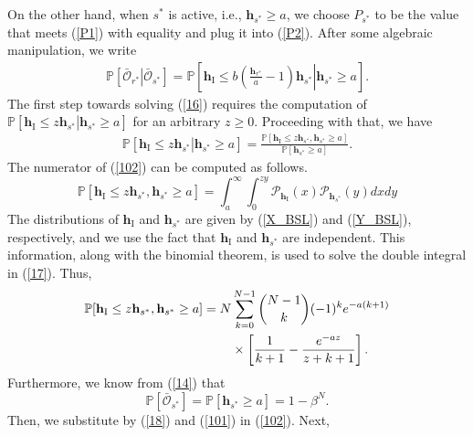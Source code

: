 \documentclass[journal,twocolumn]{IEEEtran}
\begin{document}
On the other hand, when $s^*$ is active, i.e., $\mathbf{h}_{s^*} \geq a$, we choose $P_{s^*}$ to be the value that meets (\ref{P1}) with equality and plug it into (\ref{P2}). After some algebraic manipulation, we write
\begin{align}\label{16}
\mathbb{P}\left[ \left. \bar{\mathcal{O}}_{r^*} \right| \bar{\mathcal{O}}_{s^*}\right] \!=\!
\mathbb{P}\left[ \mathbf{h}_{\mathrm{I}} \leq \left. b\left( \frac{\mathbf{h}_{r^*}}{a}-1 \right)\mathbf{h}_{s^*} \right| \mathbf{h}_{s^*} \geq a \right]\!.
\end{align}
The first step towards solving (\ref{16}) requires the computation of $\mathbb{P}[\left. \mathbf{h}_{\mathrm{I}} \leq z\mathbf{h}_{s^*} \right| \mathbf{h}_{s^*} \geq a]$ for an arbitrary $z \geq 0$. Proceeding with that, we have
\begin{align}\label{102}
\mathbb{P}[\left. \mathbf{h}_{\mathrm{I}} \leq z\mathbf{h}_{s^*} \right| \mathbf{h}_{s^*} \geq a]=
\frac{\mathbb{P}[\mathbf{h}_{\mathrm{I}} \leq z \mathbf{h}_{s^*},\mathbf{h}_{s^*} \geq a]}
{\mathbb{P}[\mathbf{h}_{s^*} \geq a]}.
\end{align}
The numerator of (\ref{102}) can be computed as follows.
\begin{equation}\label{17}
\mathbb{P}[\mathbf{h}_{\mathrm{I}} \leq z \mathbf{h}_{s^*},\mathbf{h}_{s^*} \geq a]\!=\!\!
\int_{a}^{\infty} \!\!\!\! \int_{0}^{zy} \mathcal{P}_{\mathbf{h}_{\mathrm{I}}} (x)
\mathcal{P}_{\mathbf{h}_{s^*}} (y) dx dy
\end{equation}
The distributions of $\mathbf{h}_{\mathrm{I}}$ and $\mathbf{h}_{s^*}$ are given by (\ref{X_BSL}) and (\ref{Y_BSL}), respectively, and we use the fact that $\mathbf{h}_{\mathrm{I}}$ and $\mathbf{h}_{s^*}$ are independent. This information, along with the binomial theorem, is used to solve the double integral in (\ref{17}). Thus,
\begin{align}\label{18}
\mathbb{P}[\mathbf{h}_{\mathrm{I}} \leq z \mathbf{h}_{s^*},\mathbf{h}_{s^*} \geq a]=
N & \displaystyle \sum_{k=0}^{N-1} {N-1 \choose k} (-1)^{k} e^{-a(k+1)} \notag \\ 
&
\times
\left[ \frac{1}{k+1} - \frac{e^{-az}}{z+k+1} \right].
\end{align}
Furthermore, we know from (\ref{14}) that
\begin{equation}\label{101}
\mathbb{P}\left[ \bar{\mathcal{O}}_{s^*}\right]=
\mathbb{P}[\mathbf{h}_{s^*} \geq a]=1-\beta^N.
\end{equation}
Then, we substitute by (\ref{18}) and (\ref{101}) in (\ref{102}). Next,
\end{document}
